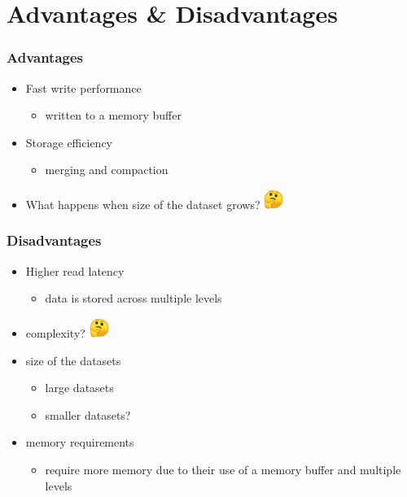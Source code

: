 \documentclass[
	11pt, 
]{beamer}
\begin{document}
\section{Advantages \& Disadvantages}
\begin{frame}
  \frametitle{Advantages}

  \begin{itemize}
    \item Fast write performance \pause
    \begin{itemize}
      \item written to a memory buffer \pause
    \end{itemize}
    \item Storage efficiency \pause
    \begin{itemize}
      \item merging and compaction \pause
    \end{itemize}
    \item What happens when size of the dataset grows? \includegraphics[width=0.05\textwidth]{emoji_thinks.png}
    
  \end{itemize}

\end{frame}


\begin{frame}
  \frametitle{Disadvantages}

  \begin{itemize}
    \item Higher read latency \pause
    \begin{itemize}
      \item data is stored across multiple levels \pause
    \end{itemize}
    \item complexity? \includegraphics[width=0.05\textwidth]{emoji_thinks.png} \pause
    \item size of the datasets \pause
    \begin{itemize}
      \item large datasets 



     \item smaller datasets? \pause
    \end{itemize}
    \item memory requirements 
    \begin{itemize}
      \item require more memory \pause
      due to their use of a memory buffer and multiple levels
    \end{itemize}
  \end{itemize}

\end{frame}
\end{document}
